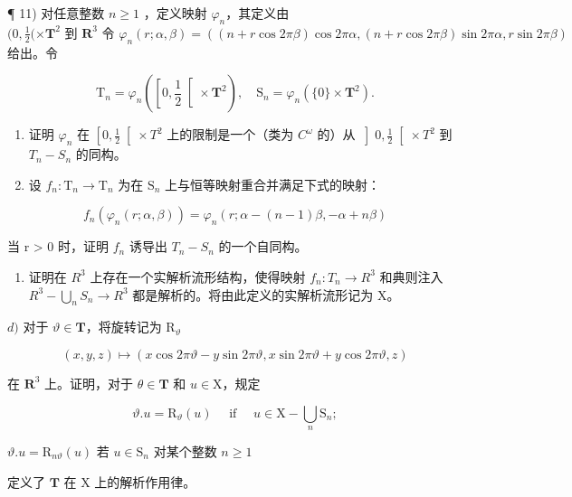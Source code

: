 ¶ 11) 对任意整数 \(n \geq 1\) ，定义映射 \(\varphi_n\)，其定义由 \((0, \frac{1}{2} (\times \mathbf{T}^2 \text{ 到 } \mathbf{R}^3 \text{ 令 } \varphi_n(r; \alpha, \beta) = ((n + r \cos 2\pi\beta) \cos 2\pi\alpha, (n + r \cos 2\pi\beta) \sin 2\pi\alpha, r \sin 2\pi\beta)\) 给出。令

\[
\mathrm{T} _ {n} = \varphi_ {n} \left(\left[ 0, \frac {1}{2} \right[ \times \mathbf {T} ^ {2}\right), \quad \mathrm{S} _ {n} = \varphi_ {n} (\{0 \} \times \mathbf {T} ^ {2}).
\]

\begin{enumerate}
\def\labelenumi{\alph{enumi})}
\item
  证明 \(\varphi_{n}\) 在 \(\left[0,\frac{1}{2}\right[\times T^{2}\) 上的限制是一个（类为 \(C^{\omega}\) 的）从 \(\left]0,\frac{1}{2}\right[\times T^{2}\) 到 \(T_{n}-S_{n}\) 的同构。
\item
  设 \(f_{n}:\mathrm{T}_{n}\to \mathrm{T}_{n}\) 为在 \(\mathrm{S}_n\) 上与恒等映射重合并满足下式的映射：
\end{enumerate}

\[
f _ {n} (\varphi_ {n} (r; \alpha , \beta)) = \varphi_ {n} (r; \alpha - (n - 1) \beta , - \alpha + n \beta)
\]

当 r \textgreater{} 0 时，证明 \(f_{n}\) 诱导出 \(T_{n} - S_{n}\) 的一个自同构。

\begin{enumerate}
\def\labelenumi{\alph{enumi})}
\setcounter{enumi}{2}
\tightlist
\item
  证明在 \(R^{3}\) 上存在一个实解析流形结构，使得映射 \(f_{n}: T_{n} \to R^{3}\) 和典则注入 \(R^{3}-\bigcup_{n} S_{n} \to R^{3}\) 都是解析的。将由此定义的实解析流形记为 X。
\end{enumerate}

\(d)\) 对于 \(\vartheta \in \mathbf{T}\)，将旋转记为 \(\mathrm{R}_{\vartheta}\)

\[
(x, y, z) \mapsto (x \cos 2 \pi \vartheta - y \sin 2 \pi \vartheta , x \sin 2 \pi \vartheta + y \cos 2 \pi \vartheta , z)
\]

在 \(\mathbf{R}^3\) 上。证明，对于 \(\theta \in \mathbf{T}\) 和 \(u \in \mathrm{X}\)，规定

\[
\vartheta . u = \mathrm{R} _ {\vartheta} (u) \quad \text { if } \quad u \in \mathrm{X} - \bigcup_ {n} \mathrm{S} _ {n};
\]

\(\vartheta .u = \mathrm{R}_{n\vartheta}(u)\) 若 \(u\in \mathrm{S}_n\) 对某个整数 \(n\geq 1\)

定义了 \(\mathbf{T}\) 在 \(\mathrm{X}\) 上的解析作用律。

